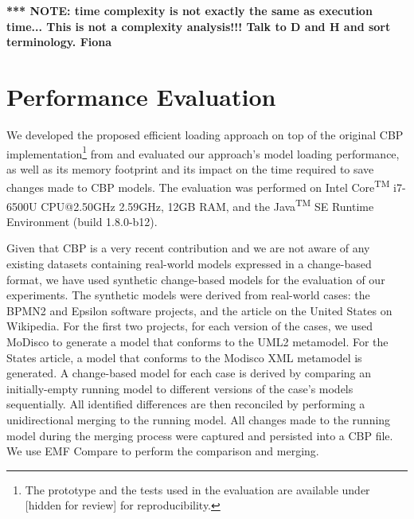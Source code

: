 \documentclass{llncs}
\begin{document}
    \textbf{*** NOTE: time complexity is not exactly the same as execution time...   This is not a complexity analysis!!!  Talk to D and H and sort terminology. Fiona}
    
    \section{Performance Evaluation}
    \label{sec:performance_evaluation}
    
    We developed the proposed efficient loading approach on top of the original CBP implementation\footnote{The prototype and the tests used in the evaluation are available under [hidden for review] for reproducibility. %
    } from \cite{yohannis2017turning} and evaluated our approach's model loading performance, as well as its memory footprint and its impact on the time required to save changes made to CBP models. The evaluation was performed on Intel\textsuperscript{\textregistered} Core\textsuperscript{TM} i7-6500U CPU@2.50GHz 2.59GHz, 12GB RAM, and the Java\textsuperscript{TM} SE Runtime Environment (build 1.8.0-b12).
    
    Given that CBP is a very recent contribution and we are not aware of any existing datasets containing real-world models expressed in a change-based format, we have used synthetic change-based models for the evaluation of our experiments. The synthetic models were derived from real-world cases: the BPMN2 \cite{eclipse2017bpmn2,eclipse2018bpmn2git} and Epsilon \cite{eclipse2017epsilon,eclipse2018epsilongit} software projects, and the article on the United States \cite{wikipedia2018us} on Wikipedia. For the first two projects, for each version of the cases, we used MoDisco \cite{DBLP:journals/infsof/BruneliereCDM14} to generate a model that conforms to the UML2 \cite{eclipse2017uml2} metamodel.  For the States article, a model that conforms to the Modisco XML metamodel \cite{eclipse2018modiscoxml} is generated. A change-based model for each case is derived by comparing an initially-empty running model to different versions of the case's models sequentially. All identified differences are then reconciled by performing a unidirectional merging to the running model. All changes made to the running model during the merging process were captured and persisted into a CBP file. We use EMF Compare \cite{eclipse2017compare} to perform the comparison and merging.
    
\end{document}
